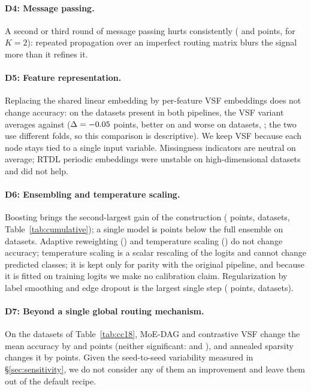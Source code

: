 \documentclass[anon,12pt]{clear2027} %
\begin{document}
\paragraph{D4: Message passing.}
A second or third round of message passing hurts consistently (\DFourKtwo{} and \DFourKthree{} points, \DFourKtwoPe{} for $K=2$): repeated propagation over an imperfect routing matrix blurs the signal more than it refines it.

\paragraph{D5: Feature representation.}
Replacing the shared linear embedding by per-feature VSF embeddings does not change accuracy: on the \VSFN{} datasets present in both pipelines, the VSF variant averages \VSFVsf{} against \VSFLin{} ($\Delta=-0.05{}$ points, better on \VSFBetter{} and worse on \VSFWorse{} datasets, \VSFPe{}; the two use different folds, so this comparison is descriptive). We keep VSF because each node stays tied to a single input variable. Missingness indicators are neutral on average; RTDL periodic embeddings \citep{gorishniy2022embeddings} were unstable on high-dimensional datasets and did not help.

\paragraph{D6: Ensembling and temperature scaling.}
Boosting brings the second-largest gain of the construction (\CumEDelta{} points, \CumEWins{} datasets, Table~\ref{tab:cumulative}); a single model is \DSixSingle{} points below the full ensemble on \DSixN{} datasets. Adaptive reweighting (\CumFDelta{}) and temperature scaling (\CumGDelta{}) do not change accuracy; temperature scaling is a scalar rescaling of the logits and cannot change predicted classes; it is kept only for parity with the original pipeline, and because it is fitted on training logits we make no calibration claim. Regularization by label smoothing and edge dropout is the largest single step (\CumDDelta{} points, \CumDWins{} datasets).

\paragraph{D7: Beyond a single global routing mechanism.}
On the \NCCtasks{} datasets of Table~\ref{tab:cc18}, MoE-DAG and contrastive VSF change the mean accuracy by \DSevenMoEDelta{} and \DSevenConDelta{} points (neither significant: \CabinVsCabinMoEPe{} and \CabinVsCabinConPe{}), and annealed sparsity changes it by \DSevenAnnealDelta{} points. Given the seed-to-seed variability measured in \S\ref{sec:sensitivity}, we do not consider any of them an improvement and leave them out of the default recipe.
\end{document}
